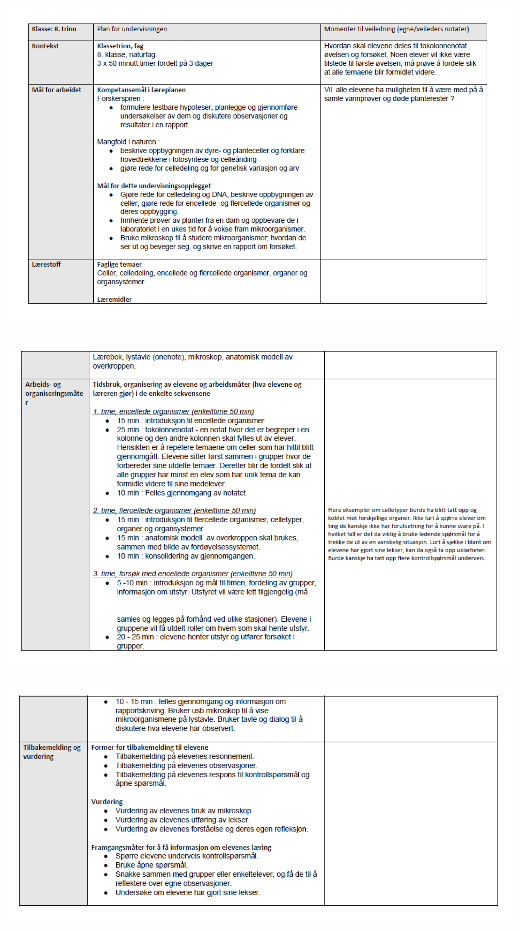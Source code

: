 \documentclass[main.tex]{subfiles}
\begin{document}
\includegraphics[scale = 0.80,angle=90]{../figures/plan_side1.png}

\includegraphics[scale = 0.80,angle=90]{../figures/plan_side2.png}

\includegraphics[scale = 0.80,angle=90]{../figures/plan_side3.png}

%
\end{document}
